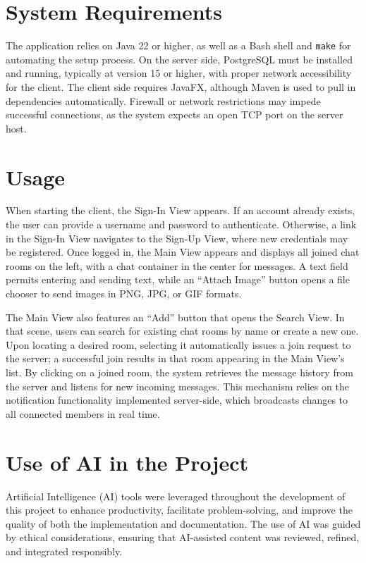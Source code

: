 \documentclass[12pt,a4paper]{report}
\begin{document}
\chapter{System Requirements}
The application relies on Java 22 or higher, as well as a Bash shell and
\texttt{make} for automating the setup process. On the server side, PostgreSQL
must be installed and running, typically at version 15 or higher, with proper
network accessibility for the client. The client side requires JavaFX, although
Maven is used to pull in dependencies automatically. Firewall or network
restrictions may impede successful connections, as the system expects an open
TCP port on the server host.

\chapter{Usage}
When starting the client, the Sign-In View appears. If an account already
exists, the user can provide a username and password to authenticate.
Otherwise, a link in the Sign-In View navigates to the Sign-Up View, where new
credentials may be registered. Once logged in, the Main View appears and
displays all joined chat rooms on the left, with a chat container in the center
for messages. A text field permits entering and sending text, while an “Attach
Image” button opens a file chooser to send images in PNG, JPG, or GIF formats.

The Main View also features an “Add” button that opens the Search View. In that
scene, users can search for existing chat rooms by name or create a new one.
Upon locating a desired room, selecting it automatically issues a join request
to the server; a successful join results in that room appearing in the Main
View’s list. By clicking on a joined room, the system retrieves the message
history from the server and listens for new incoming messages. This mechanism
relies on the notification functionality implemented server-side, which
broadcasts changes to all connected members in real time.

\chapter{Use of AI in the Project}
\label{ch:ai_usage}

Artificial Intelligence (AI) tools were leveraged throughout the development of
this project to enhance productivity, facilitate problem-solving, and improve
the quality of both the implementation and documentation. The use of AI was
guided by ethical considerations, ensuring that AI-assisted content was
reviewed, refined, and integrated responsibly.
\end{document}

